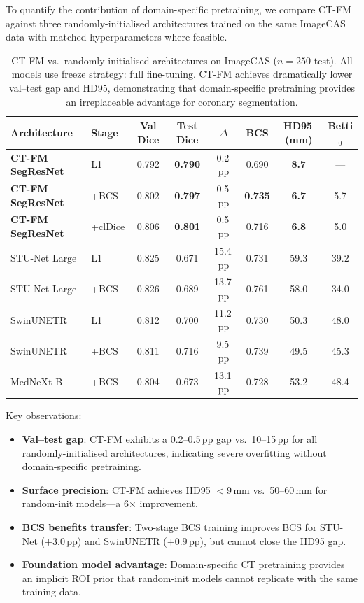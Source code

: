 \documentclass[runningheads]{llncs}
\begin{document}
To quantify the contribution of domain-specific pretraining, we compare CT-FM against three randomly-initialised architectures trained on the same ImageCAS data with matched hyperparameters where feasible.

\begin{table}[h]
\caption{CT-FM vs.\ randomly-initialised architectures on ImageCAS ($n{=}250$ test). All models use freeze strategy: full fine-tuning. CT-FM achieves dramatically lower val--test gap and HD95, demonstrating that domain-specific pretraining provides an irreplaceable advantage for coronary segmentation.}
\label{tab:random_init}
\centering
\small
\begin{tabular}{llcccccc}
\toprule
Architecture & Stage & Val Dice & Test Dice & $\Delta$ & BCS & HD95\,(mm) & Betti$_0$ \\
\midrule
\textbf{CT-FM SegResNet} & L1 & 0.792 & \textbf{0.790} & 0.2\,pp & 0.690 & \textbf{8.7} & --- \\
\textbf{CT-FM SegResNet} & +BCS & 0.802 & \textbf{0.797} & 0.5\,pp & \textbf{0.735} & \textbf{6.7} & 5.7 \\
\textbf{CT-FM SegResNet} & +clDice & 0.806 & \textbf{0.801} & 0.5\,pp & 0.716 & \textbf{6.8} & 5.0 \\
\midrule
STU-Net Large & L1 & 0.825 & 0.671 & 15.4\,pp & 0.731 & 59.3 & 39.2 \\
STU-Net Large & +BCS & 0.826 & 0.689 & 13.7\,pp & 0.761 & 58.0 & 34.0 \\
\midrule
SwinUNETR & L1 & 0.812 & 0.700 & 11.2\,pp & 0.730 & 50.3 & 48.0 \\
SwinUNETR & +BCS & 0.811 & 0.716 & 9.5\,pp & 0.739 & 49.5 & 45.3 \\
\midrule
MedNeXt-B & +BCS & 0.804 & 0.673 & 13.1\,pp & 0.728 & 53.2 & 48.4 \\
\bottomrule
\end{tabular}
\end{table}

Key observations:
\begin{itemize}
\item \textbf{Val--test gap}: CT-FM exhibits a 0.2--0.5\,pp gap vs.\ 10--15\,pp for all randomly-initialised architectures, indicating severe overfitting without domain-specific pretraining.
\item \textbf{Surface precision}: CT-FM achieves HD95 $< 9$\,mm vs.\ 50--60\,mm for random-init models---a 6$\times$ improvement.
\item \textbf{BCS benefits transfer}: Two-stage BCS training improves BCS for STU-Net ($+3.0$\,pp) and SwinUNETR ($+0.9$\,pp), but cannot close the HD95 gap.
\item \textbf{Foundation model advantage}: Domain-specific CT pretraining provides an implicit ROI prior that random-init models cannot replicate with the same training data.
\end{itemize}
\end{document}
